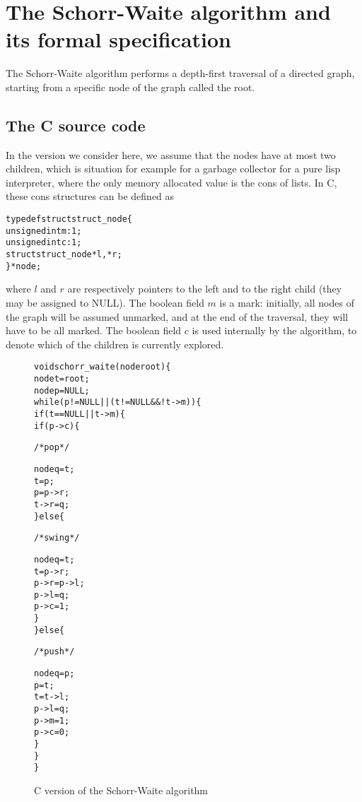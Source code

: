 
\section{The Schorr-Waite algorithm and its formal specification}
\label{sec:algo}

The Schorr-Waite algorithm performs a depth-first traversal of a
directed graph, starting from a specific node of the graph called the
root. 

\subsection{The C source code}

In the version we consider here, we assume that the nodes have
at most two children, which is situation for example for a garbage
collector for a pure lisp interpreter, where the only memory allocated value
is the \textsf{cons} of lists. In C, these \textsf{cons} structures
can be defined as
\begin{alltt}
typedef struct struct_node \{
  unsigned int m :1;
  unsigned int c :1;
  struct struct_node *l, *r;
\} * node;
\end{alltt}
where $l$ and $r$ are respectively pointers to the left and to the
right child (they may be assigned to NULL). The boolean field $m$ is a
mark: initially, all nodes of the graph will be assumed unmarked, and
at the end of the traversal, they will have to be all marked. The
boolean field $c$ is used internally by the algorithm, to denote which
of the children is currently explored.
 
\begin{figure}[t]
\begin{alltt}
void schorr_waite(node root) \{
  node t = root;
  node p = NULL;
  while (p != NULL || (t != NULL && ! t->m)) \{
    if (t == NULL || t->m) \{
      if (p->c) \{ \begin{slshape}/* pop */\end{slshape}
        node q = t;
        t = p;
        p = p->r;
        t->r = q;
        \} else \{ \begin{slshape}/* swing */\end{slshape}
        node q = t;
        t = p->r;
        p->r = p->l;
        p->l = q;
        p->c = 1;
      \}
    \} else \{ \begin{slshape}/* push */ \end{slshape}
      node q = p;
      p = t;
      t = t->l;
      p->l = q;
      p->m = 1;
      p->c = 0;
    \}
  \}
\}
\end{alltt}
\caption{C version of the Schorr-Waite algorithm}
\label{fig:code}
\end{figure}

